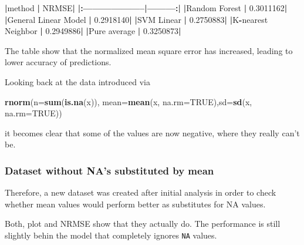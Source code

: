 \documentclass[
]{article}
\newenvironment{Shaded}{\begin{snugshade}}{\end{snugshade}}
\newcommand{\DataTypeTok}[1]{\textcolor[rgb]{0.13,0.29,0.53}{#1}}
\newcommand{\ErrorTok}[1]{\textcolor[rgb]{0.64,0.00,0.00}{\textbf{#1}}}
\newcommand{\FloatTok}[1]{\textcolor[rgb]{0.00,0.00,0.81}{#1}}
\newcommand{\KeywordTok}[1]{\textcolor[rgb]{0.13,0.29,0.53}{\textbf{#1}}}
\newcommand{\NormalTok}[1]{#1}
\newcommand{\OperatorTok}[1]{\textcolor[rgb]{0.81,0.36,0.00}{\textbf{#1}}}
\newcommand{\OtherTok}[1]{\textcolor[rgb]{0.56,0.35,0.01}{#1}}
\newcommand{\StringTok}[1]{\textcolor[rgb]{0.31,0.60,0.02}{#1}}
\begin{document}
\begin{Shaded}
\begin{Highlighting}[]
\OperatorTok{|}\NormalTok{method               }\OperatorTok{|}\StringTok{     }\NormalTok{NRMSE}\OperatorTok{|}
\ErrorTok{|:}\OperatorTok{--------------------}\ErrorTok{|}\OperatorTok{---------}\ErrorTok{:|}
\ErrorTok{|}\NormalTok{Random Forest        }\OperatorTok{|}\StringTok{ }\FloatTok{0.3011162}\OperatorTok{|}
\ErrorTok{|}\NormalTok{General Linear Model }\OperatorTok{|}\StringTok{ }\FloatTok{0.2918140}\OperatorTok{|}
\ErrorTok{|}\NormalTok{SVM Linear           }\OperatorTok{|}\StringTok{ }\FloatTok{0.2750883}\OperatorTok{|}
\ErrorTok{|}\NormalTok{K}\OperatorTok{-}\NormalTok{nearest Neighbor   }\OperatorTok{|}\StringTok{ }\FloatTok{0.2949886}\OperatorTok{|}
\ErrorTok{|}\NormalTok{Pure average         }\OperatorTok{|}\StringTok{ }\FloatTok{0.3250873}\OperatorTok{|}
\end{Highlighting}
\end{Shaded}

The table show that the normalized mean square error has increased,
leading to lower accuracy of predictions.

Looking back at the data introduced via

\begin{Shaded}
\begin{Highlighting}[]
\KeywordTok{rnorm}\NormalTok{(}\DataTypeTok{n=}\KeywordTok{sum}\NormalTok{(}\KeywordTok{is.na}\NormalTok{(x)), }\DataTypeTok{mean=}\KeywordTok{mean}\NormalTok{(x, }\DataTypeTok{na.rm=}\OtherTok{TRUE}\NormalTok{),}\DataTypeTok{sd=}\KeywordTok{sd}\NormalTok{(x, }\DataTypeTok{na.rm=}\OtherTok{TRUE}\NormalTok{))}
\end{Highlighting}
\end{Shaded}

it becomes clear that some of the values are now negative, where they
really can't be.

\hypertarget{dataset-without-nas-substituted-by-mean}{%
\subsubsection{Dataset without NA's substituted by
mean}\label{dataset-without-nas-substituted-by-mean}}

Therefore, a new dataset was created after initial analysis in order to
check whether mean values would perform better as substitutes for NA
values.

Both, plot and NRMSE show that they actually do. The performance is
still slightly behin the model that completely ignores \texttt{NA}
values.
\end{document}
